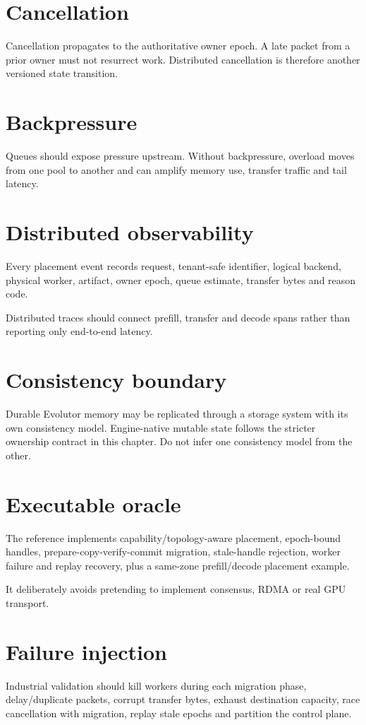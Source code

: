 \section{Cancellation}
Cancellation propagates to the authoritative owner epoch. A late packet from a prior owner must not resurrect work. Distributed cancellation is therefore another versioned state transition.

\section{Backpressure}
Queues should expose pressure upstream. Without backpressure, overload moves from one pool to another and can amplify memory use, transfer traffic and tail latency.

\section{Distributed observability}
Every placement event records request, tenant-safe identifier, logical backend, physical worker, artifact, owner epoch, queue estimate, transfer bytes and reason code.

Distributed traces should connect prefill, transfer and decode spans rather than reporting only end-to-end latency.

\section{Consistency boundary}
Durable Evolutor memory may be replicated through a storage system with its own consistency model. Engine-native mutable state follows the stricter ownership contract in this chapter. Do not infer one consistency model from the other.

\section{Executable oracle}
The reference implements capability/topology-aware placement, epoch-bound handles, prepare-copy-verify-commit migration, stale-handle rejection, worker failure and replay recovery, plus a same-zone prefill/decode placement example.

It deliberately avoids pretending to implement consensus, RDMA or real GPU transport.

\section{Failure injection}
Industrial validation should kill workers during each migration phase, delay/duplicate packets, corrupt transfer bytes, exhaust destination capacity, race cancellation with migration, replay stale epochs and partition the control plane.

